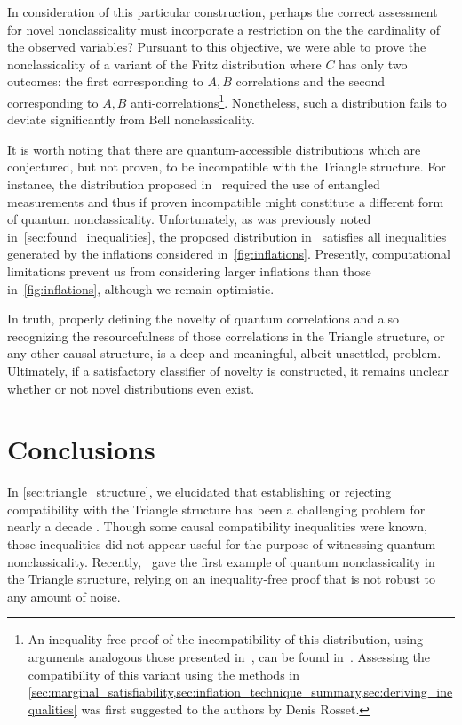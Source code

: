\documentclass[aps, 10pt, english, twoside, pra, nofootinbib, tightenlines, longbibliography, superscriptaddress]{revtex4-1}
\begin{document}
    In consideration of this particular construction, perhaps the correct assessment for novel nonclassicality must incorporate a restriction on the the cardinality of the observed variables? Pursuant to this objective, we were able to prove the nonclassicality of a variant of the Fritz distribution where $C$ has only two outcomes: the first corresponding to $A, B$ correlations and the second corresponding to $A, B$ anti-correlations\footnote{An inequality-free proof of the incompatibility of this distribution, using arguments analogous those presented in~\cite{Fritz_2012}, can be found in~\cite{Weilenmann_2016}. Assessing the compatibility of this variant using the methods in \cref{sec:marginal_satisfiability,sec:inflation_technique_summary,sec:deriving_inequalities} was first suggested to the authors by Denis Rosset.}. Nonetheless, such a distribution fails to deviate significantly from Bell nonclassicality.

    It is worth noting that there are quantum-accessible distributions which are conjectured, but not proven, to be incompatible with the Triangle structure. For instance, the distribution proposed in~\cite{Gisin_2017} required the use of entangled measurements and thus if proven incompatible might constitute a different form of quantum nonclassicality. Unfortunately, as was previously noted in~\cref{sec:found_inequalities}, the proposed distribution in~\cite{Gisin_2017} satisfies all inequalities generated by the inflations considered in~\cref{fig:inflations}. Presently, computational limitations prevent us from considering larger inflations than those in~\cref{fig:inflations}, although we remain optimistic.

    In truth, properly defining the novelty of quantum correlations and also recognizing the resourcefulness of those correlations in the Triangle structure, or any other causal structure, is a deep and meaningful, albeit unsettled, problem. Ultimately, if a satisfactory classifier of novelty is constructed, it remains unclear whether or not novel distributions even exist.

    \section{Conclusions}
    \label{sec:conclusions}
    In \cref{sec:triangle_structure}, we elucidated that establishing or rejecting compatibility with the Triangle structure has been a challenging problem for nearly a decade \cite{Steudel_2010,Branciard_2012,Henson_2014,Fritz_2012,Gisin_2017}. Though some causal compatibility inequalities were known, those inequalities did not appear useful for the purpose of witnessing quantum nonclassicality. Recently,~\citet{Fritz_2012} gave the first example of quantum nonclassicality in the Triangle structure, relying on an inequality-free proof that is not robust to any amount of noise.
\end{document}
